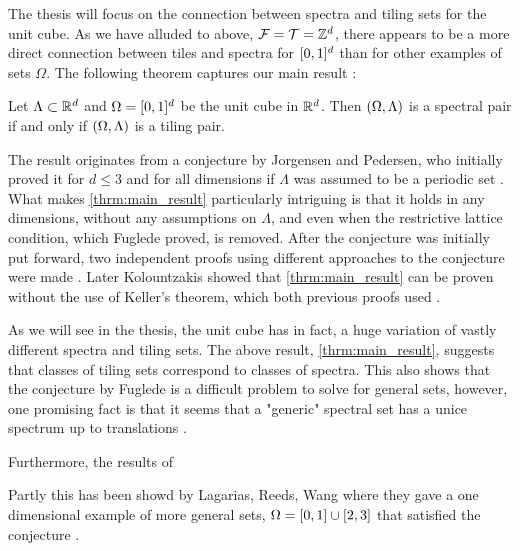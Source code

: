 \documentclass[../thesis.tex]{subfiles}
\begin{document}
The thesis will focus on the connection between spectra and tiling sets for the unit cube. As we have alluded to above, $\mathcal{F}=\mathcal{T}=\mathbb{Z}^d$, there appears to be a more direct connection between tiles and spectra for $[0,1]^d$ than for other examples of sets $\Omega$. The following theorem captures our main result \cite{iosevichSpectralTilingProperties1998}:

\begin{theorem}\label{thrm:main_result}
    Let $\Lambda\subset \mathbb{R}^d$ and $\Omega=[0,1]^d$ be the unit cube in $\mathbb{R}^d$. Then $(\Omega,\Lambda)$ is a spectral pair if and only if $(\Omega,\Lambda)$ is a tiling pair.
\end{theorem}

The result originates from a conjecture by Jorgensen and Pedersen, who initially proved it for $d\leq3$ and for all dimensions if $\Lambda$ was assumed to be a periodic set \cite{jorgensenSpectralPairsCartesian2001}. What makes \cref{thrm:main_result} particularly intriguing is that it holds in any dimensions, without any assumptions on $\Lambda$, and even when the restrictive lattice condition, which Fuglede proved, is removed. After the conjecture was initially put forward, two independent proofs using different approaches to the conjecture were made \cite{lagariasOrthonormalBasesExponentials2000,iosevichSpectralTilingProperties1998}. Later Kolountzakis showed that \cref{thrm:main_result} can be proven without the use of Keller's theorem, which both previous proofs used \cite{kolountzakisPackingTilingOrthogonality2000}. 

As we will see in the thesis, the unit cube has in fact, a huge variation of vastly different spectra and tiling sets. 
The above result, \cref{thrm:main_result}, suggests that classes of tiling sets correspond to classes of spectra. This also shows that the conjecture by Fuglede is a difficult problem to solve for general sets, however, one promising fact is that it seems that a "generic" spectral set has a unice spectrum up to translations \cite{lagariasOrthonormalBasesExponentials2000}. 

Furthermore, the results of 

Partly this has been showd by Lagarias, Reeds, Wang where they gave a one dimensional example of more general sets, $\Omega=[0,1]\cup [2,3]$  that satisfied the conjecture \cite{lagariasOrthonormalBasesExponentials2000}.
\end{document}
